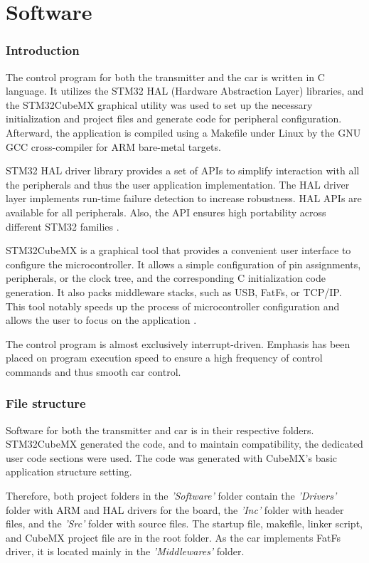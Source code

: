 


\part{Software}
\label{chap:software}
\section{Introduction}
The control program for both the transmitter and the car is written in C language. It utilizes the STM32 HAL (Hardware Abstraction Layer) libraries, and the STM32CubeMX graphical utility was used to set up the necessary initialization and project files and generate code for peripheral configuration. Afterward, the application is compiled using a Makefile under Linux by the GNU GCC cross-compiler for ARM bare-metal targets.

STM32 HAL driver library provides a set of APIs to simplify interaction with all the peripherals and thus the user application implementation. The HAL driver layer implements run-time failure detection to increase robustness. HAL APIs are available for all peripherals. Also, the API ensures high portability across different STM32 families \cite{hal}.

STM32CubeMX is a graphical tool that provides a convenient user interface to configure the microcontroller. It allows a simple configuration of pin assignments, peripherals, or the clock tree, and the corresponding C initialization code generation. It also packs middleware stacks, such as USB, FatFs, or TCP/IP. This tool notably speeds up the process of microcontroller configuration and allows the user to focus on the application \cite{cubemx}.

The control program is almost exclusively interrupt-driven. Emphasis has been placed on program execution speed to ensure a high frequency of control commands and thus smooth car control.

\section{File structure}
Software for both the transmitter and car is in their respective folders. STM32CubeMX generated the code, and to maintain compatibility, the dedicated user code sections were used. The code was generated with CubeMX's basic application structure setting.

Therefore, both project folders in the \textit{'Software'} folder contain the \textit{'Drivers'} folder with ARM and HAL drivers for the board, the \textit{'Inc'} folder with header files, and the \textit{'Src'} folder with source files. The startup file, makefile, linker script, and CubeMX project file are in the root folder. As the car implements FatFs driver, it is located mainly in the \textit{'Middlewares'} folder.

